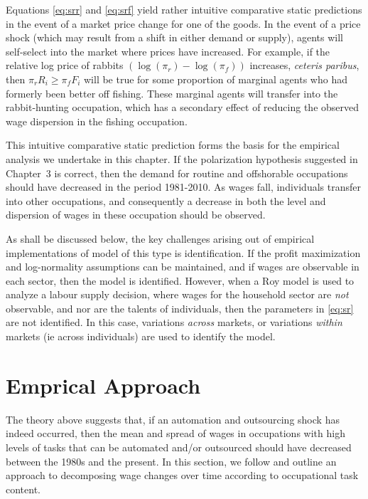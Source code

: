 Equations \eqref{eq:srr} and \eqref{eq:srf} yield rather intuitive comparative static predictions in the event of a market price change for one of the goods. In the event of a price shock (which may result from a shift in either demand or supply), agents will self-select into the market where prices have increased. For example, if the relative log price of rabbits ${\left(\log(\pi_r)-\log(\pi_f)\right)}$ increases, {\em ceteris paribus}, then ${\pi_rR_i \geq \pi_fF_i}$ will be true for some proportion of marginal agents who had formerly been better off fishing. These marginal agents will transfer into the rabbit-hunting occupation, which has a secondary effect of reducing the observed wage dispersion in the fishing occupation.

This intuitive comparative static prediction forms the basis for the empirical analysis we undertake in this chapter. If the polarization hypothesis suggested in Chapter~3 is correct, then the demand for routine and offshorable occupations should have decreased in the period 1981-2010. As wages fall, individuals transfer into other occupations, and consequently a decrease in both the level and dispersion of wages in these occupation should be observed.

As shall be discussed below, the key challenges arising out of empirical implementations of model of this type is identification. If the profit maximization and log-normality assumptions can be maintained, and if wages are observable in each sector, then the model is identified. However, when a Roy model is used to analyze a labour supply decision, where wages for the household sector are {\em not} observable, and nor are the talents of individuals, then the parameters in \eqref{eq:sr} are not identified. In this case, variations {\em across } markets, or variations {\em within } markets (ie across individuals) are used to identify the model.

\section{Emprical Approach}

The theory above suggests that, if an automation and outsourcing shock has indeed occurred, then the mean and spread of wages in occupations with high levels of tasks that can be automated and/or outsourced should have decreased between the 1980s and the present. In this section, we follow \citet{Firpo2011} and outline an approach to decomposing wage changes over time according to occupational task content.


